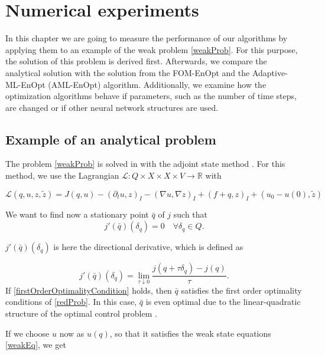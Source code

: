 \chapter{\label{chapterNumericalExperiments}Numerical experiments}

In this chapter we are going to measure the performance of our algorithms by applying them to an example of the weak problem \eqref{weakProb}. For this purpose, the solution of this problem is derived first. Afterwards, we compare the analytical solution with the solution from the FOM-EnOpt and the Adaptive-ML-EnOpt (AML-EnOpt) algorithm. Additionally, we examine how the optimization algorithms behave if parameters, such as the number of time steps, are changed or if other neural network structures are used.

\section{Example of an analytical problem}

The problem \eqref{weakProb} is solved in \cite{doi:10.1137/070694016} with the adjoint state method \cite{Plessix2006ARO,Becker2007}. For this method, we use the Lagrangian $\mathcal{L}:Q\times X\times X \times V\to\mathbb{R}$ with

\begin{equation}
\label{lagrangian}
\mathcal{L}(q,u,z,\tilde{z})=J(q,u)-(\partial_tu,z)_I-(\nabla u, \nabla z)_I+(f+q, z)_I + (u_0-u(0), \tilde{z})
\end{equation}

We want to find now a stationary point $\bar{q}$ of $j$ such that
\begin{equation}
\label{firstOrderOptimalityCondition}
j'(\bar{q})(\delta_q)=0\quad\forall \delta_q\in Q.
\end{equation}

$j'(\bar{q})(\delta_q)$ is here the directional derivative, which is defined as

\begin{displaymath}
j'(\bar{q})(\delta_q)=\lim_{\tau\downarrow0}\frac{j(q+\tau\delta_q)-j(q)}{\tau}.
\end{displaymath}
If \eqref{firstOrderOptimalityCondition} holds, then $\bar{q}$ satisfies the first order optimality conditions of \eqref{redProb}. In this case, $\bar{q}$ is even optimal due to the linear-quadratic structure of the optimal control problem \cite{doi:10.1137/070694016}.

If we choose $u$ now as $u(q)$, so that it satisfies the weak state equations \eqref{weakEq}, we get

